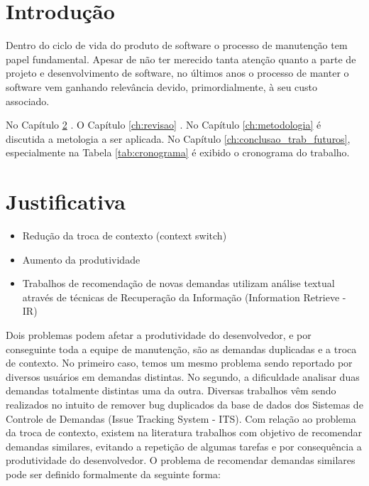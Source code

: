 \documentclass[msc,proposal,hidelot,hideabstract]{ppgccufmg} %
\begin{document}
\chapter{Introdução}
\label{ch:intro}
Dentro do ciclo de vida do produto de software o processo de manutenção tem
papel fundamental. Apesar de não ter merecido tanta atenção quanto a parte de
projeto e desenvolvimento de software, no últimos anos o processo de manter o
software vem ganhando relevância devido, primordialmente, à seu custo
associado.

No Capítulo \ref{ch:justificativa} . O Capítulo \ref{ch:revisao} . No
Capítulo \ref{ch:metodologia} é discutida a metologia a ser aplicada. No
Capítulo \ref{ch:conclusao_trab_futuros}, especialmente na Tabela \ref{tab:cronograma} é exibido o cronograma do trabalho.

\chapter{Justificativa}
\label{ch:justificativa}

\begin{itemize}
\item Redução da troca de contexto (context switch)
\item Aumento da produtividade
\item Trabalhos de recomendação de novas demandas utilizam análise textual através de técnicas de Recuperação da Informação (Information Retrieve - IR)
\end{itemize}

Dois problemas podem afetar a produtividade do desenvolvedor, e por conseguinte
toda a equipe de manutenção, são as demandas duplicadas e a troca de
contexto. No primeiro caso, temos um mesmo problema sendo reportado por
diversos usuários em demandas distintas. No segundo, a dificuldade analisar
duas demandas totalmente distintas uma da outra. Diversas trabalhos vêm sendo
realizados no intuito de remover bug duplicados da base de dados dos Sistemas
de Controle de Demandas (Issue Tracking System - ITS).
Com relação ao problema da troca de contexto, existem na literatura trabalhos
com objetivo de recomendar demandas similares, evitando a repetição de algumas
tarefas e por consequência a produtividade do desenvolvedor.
O problema de recomendar demandas similares pode ser definido formalmente da
seguinte forma:
\end{document}
